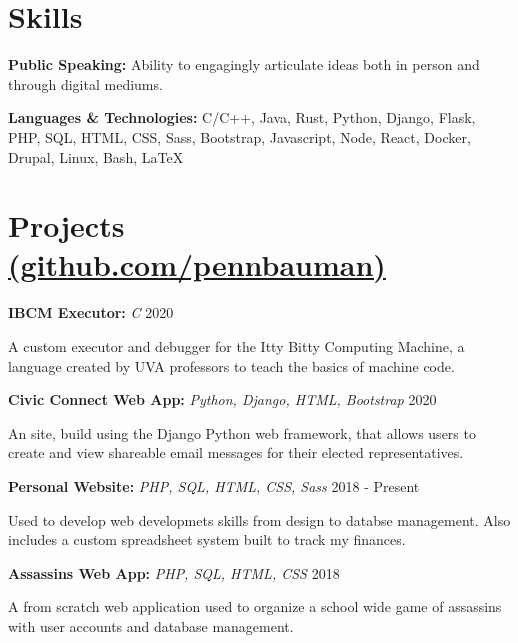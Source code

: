 \documentclass[11pt]{article}
\begin{document}
\section*{Skills}

\noindent\textbf{Public Speaking:} Ability to engagingly articulate ideas both in person and through digital mediums.

\noindent\textbf{Languages \& Technologies:}
	C/C++,
	Java,
	Rust,
	Python, Django, Flask,
	PHP, SQL, HTML,
	CSS, Sass, Bootstrap,
	Javascript, Node, React,
	Docker,
	Drupal,
	Linux, Bash,
	LaTeX



\section*{Projects \href{https://github.com/pennbauman}{\textmd{\normalsize (github.com/pennbauman)}}}

\noindent\textbf{IBCM Executor:} \textit{C}
\hspace*{\fill} 2020

\noindent A custom executor and debugger for the Itty Bitty Computing Machine, a language created by UVA professors to teach the basics of machine code.


\vspace*{1mm}


\noindent\textbf{Civic Connect Web App:} \textit{Python, Django, HTML, Bootstrap}
\hspace*{\fill} 2020

\noindent An site, build using the Django Python web framework, that allows users to create and view shareable email messages for their elected representatives.


\vspace*{1mm}


\noindent\textbf{Personal Website:} \textit{PHP, SQL, HTML, CSS, Sass}
\hspace*{\fill} 2018 - Present

\noindent Used to develop web developmets skills from design to databse management. Also includes a custom spreadsheet system built to track my finances.


\vspace*{1mm}


\noindent\textbf{Assassins Web App:} \textit{PHP, SQL, HTML, CSS}
\hspace*{\fill} 2018

\noindent A from scratch web application used to organize a school wide game of assassins with user accounts and database management.
\end{document}
